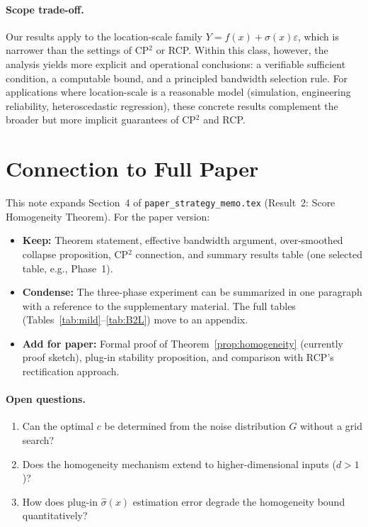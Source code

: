 \documentclass[11pt]{article}
\newif\ifpaper
\theoremstyle{remark}
\begin{document}
\paragraph{Scope trade-off.}
Our results apply to the location-scale family
$Y = f(x) + \sigma(x)\varepsilon$, which is narrower than the
settings of CP$^2$ or RCP. Within this class, however, the analysis yields more explicit and
operational conclusions: a verifiable sufficient condition, a
computable bound, and a principled bandwidth selection rule. For
applications where location-scale is a reasonable model (simulation,
engineering reliability, heteroscedastic regression), these concrete
results complement the broader but more implicit guarantees of
CP$^2$ and RCP.


\ifpaper\else
\section{Connection to Full Paper}
\label{sec:connection}

This note expands Section~4 of \texttt{paper\_strategy\_memo.tex}
(Result~2: Score Homogeneity Theorem). For the paper version:

\begin{itemize}
  \item \textbf{Keep:} Theorem statement, effective bandwidth argument,
    over-smoothed collapse proposition, CP$^2$ connection, and summary
    results table (one selected table, e.g., Phase~1).
  \item \textbf{Condense:} The three-phase experiment can be summarized
    in one paragraph with a reference to the supplementary material.
    The full tables (Tables~\ref{tab:mild}--\ref{tab:B2L}) move to an
    appendix.
  \item \textbf{Add for paper:} Formal proof of
    Theorem~\ref{prop:homogeneity} (currently proof sketch), plug-in
    stability proposition, and comparison with RCP's rectification
    approach.
\end{itemize}

\paragraph{Open questions.}
\begin{enumerate}
  \item Can the optimal $c$ be determined from the noise distribution
    $G$ without a grid search?
  \item Does the homogeneity mechanism extend to higher-dimensional
    inputs ($d > 1$)?
  \item How does plug-in $\hat\sigma(x)$ estimation error degrade the
    homogeneity bound quantitatively?
\end{enumerate}
\fi %
\end{document}
